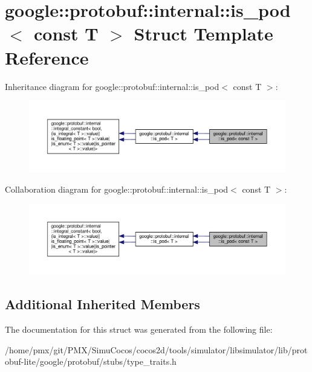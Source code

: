 \hypertarget{structgoogle_1_1protobuf_1_1internal_1_1is__pod_3_01const_01T_01_4}{}\section{google\+:\+:protobuf\+:\+:internal\+:\+:is\+\_\+pod$<$ const T $>$ Struct Template Reference}
\label{structgoogle_1_1protobuf_1_1internal_1_1is__pod_3_01const_01T_01_4}


Inheritance diagram for google\+:\+:protobuf\+:\+:internal\+:\+:is\+\_\+pod$<$ const T $>$\+:
\nopagebreak
\begin{figure}[H]
\begin{center}
\leavevmode
\includegraphics[width=350pt]{structgoogle_1_1protobuf_1_1internal_1_1is__pod_3_01const_01T_01_4__inherit__graph}
\end{center}
\end{figure}


Collaboration diagram for google\+:\+:protobuf\+:\+:internal\+:\+:is\+\_\+pod$<$ const T $>$\+:
\nopagebreak
\begin{figure}[H]
\begin{center}
\leavevmode
\includegraphics[width=350pt]{structgoogle_1_1protobuf_1_1internal_1_1is__pod_3_01const_01T_01_4__coll__graph}
\end{center}
\end{figure}
\subsection*{Additional Inherited Members}


The documentation for this struct was generated from the following file\+:\begin{DoxyCompactItemize}
\item 
/home/pmx/git/\+P\+M\+X/\+Simu\+Cocos/cocos2d/tools/simulator/libsimulator/lib/protobuf-\/lite/google/protobuf/stubs/type\+\_\+traits.\+h\end{DoxyCompactItemize}
